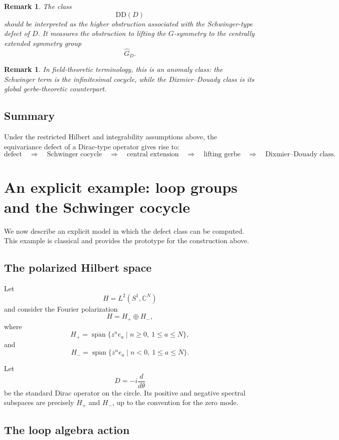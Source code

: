 \documentclass[11pt]{amsart}
\newtheorem{remark}[definition]{Remark}
\begin{document}
\begin{remark}
The class
\[
\mathrm{DD}(D)
\]
should be interpreted as the higher obstruction associated with the
Schwinger-type defect of \(D\). It measures the obstruction to lifting the
\(G\)-symmetry to the centrally extended symmetry group
\[
\widehat G_D.
\]
\end{remark}

\begin{remark}
In field-theoretic terminology, this is an anomaly class: the Schwinger term
is the infinitesimal cocycle, while the Dixmier--Douady class is its global
gerbe-theoretic counterpart.
\end{remark}

\subsection{Summary}

Under the restricted Hilbert and integrability assumptions above, the
equivariance defect of a Dirac-type operator gives rise to:
\[
\text{defect}
\quad\Rightarrow\quad
\text{Schwinger cocycle}
\quad\Rightarrow\quad
\text{central extension}
\quad\Rightarrow\quad
\text{lifting gerbe}
\quad\Rightarrow\quad
\text{Dixmier--Douady class}.
\]
\section{An explicit example: loop groups and the Schwinger cocycle}
\label{sec:loop-example}

We now describe an explicit model in which the defect class can be computed.
This example is classical and provides the prototype for the construction above.

\subsection{The polarized Hilbert space}

Let
\[
H=L^2(S^1,\mathbb C^N)
\]
and consider the Fourier polarization
\[
H=H_+\oplus H_-,
\]
where
\[
H_+
=
\overline{\operatorname{span}}\{z^n e_a \mid n\geq0,\ 1\leq a\leq N\},
\]
and
\[
H_-
=
\overline{\operatorname{span}}\{z^n e_a \mid n<0,\ 1\leq a\leq N\}.
\]

Let
\[
D=-i\frac{d}{d\theta}
\]
be the standard Dirac operator on the circle. Its positive and negative spectral subspaces are precisely \(H_+\) and \(H_-\), up to the convention for the zero mode.

\subsection{The loop algebra action}
\end{document}
